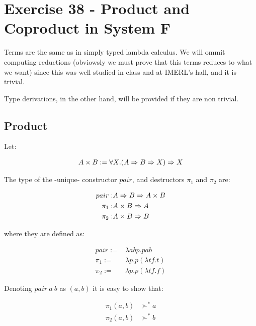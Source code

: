 \section{Exercise 38 - Product and Coproduct in System F}


Terms are the same as in simply typed lambda calculus.
We will ommit computing reductions (obviowsly we must prove that
this terms reduces to what we want) since this was
well studied in class and at IMERL's hall, and it is trivial.

Type derivations, in the other hand, will be provided if they are
non trivial.


\subsection*{Product}

Let:

\begin{align*}
  A \times B := \forall X. (A\Rightarrow B\Rightarrow X) \Rightarrow X \nonumber
\end{align*}
  
  The type of the -unique- constructor $pair$, and destructors $\pi_1$ and
  $\pi_2$ are:

\begin{align}
  pair  :& A \Rightarrow B \Rightarrow A\times B  \nonumber \\
  \pi_1 :& A \times B \Rightarrow A        \nonumber \\
  \pi_2 :& A \times B \Rightarrow B        \nonumber
\end{align}
  
  where they are defined as:

\begin{align}
  pair :=& \lambda a b p . p a b        \nonumber \\
  \pi_1:=& \lambda p. p (\lambda t f.t) \nonumber \\
  \pi_2:=& \lambda p. p (\lambda t f.f) \nonumber
\end{align}

Denoting $pair\ a\ b$ as $(a,b)$ it is easy to show that:

\begin{align*}
  \pi_1 (a,b) &\succ^{*} a \\
  \pi_2 (a,b) &\succ^{*} b
\end{align*}

